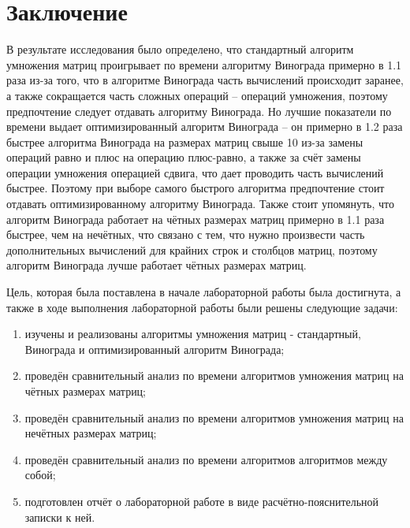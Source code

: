 \chapter*{Заключение}

В результате исследования было определено, что стандартный алгоритм умножения матриц проигрывает по времени алгоритму Винограда примерно в 1.1 раза из-за того, что в алгоритме Винограда часть вычислений происходит заранее, а также сокращается часть сложных операций -- операций умножения, поэтому предпочтение следует отдавать алгоритму Винограда. 
Но лучшие показатели по времени выдает оптимизированный алгоритм Винограда -- он примерно в 1.2 раза быстрее алгоритма Винограда на размерах матриц свыше 10 из-за замены операций равно и плюс на операцию плюс-равно, а также за счёт замены операции умножения операцией сдвига, что дает проводить часть вычислений быстрее. 
Поэтому при выборе самого быстрого алгоритма предпочтение стоит отдавать оптимизированному алгоритму Винограда. 
Также стоит упомянуть, что алгоритм Винограда работает на чётных размерах матриц примерно в 1.1 раза быстрее, чем на нечётных, что связано с тем, что нужно произвести часть дополнительных вычислений для крайних строк и столбцов матриц, поэтому алгоритм Винограда лучше работает чётных размерах матриц.


Цель, которая была поставлена в начале лабораторной работы была достигнута, а также в ходе выполнения лабораторной работы были решены следующие задачи:

\begin{enumerate}[label=\arabic*)]
	\item изучены и реализованы алгоритмы умножения матриц - стандартный, Винограда и оптимизированный алгоритм Винограда;
    \item проведён сравнительный анализ по времени алгоритмов умножения матриц на чётных размерах матриц;
	\item проведён сравнительный анализ по времени алгоритмов умножения матриц на нечётных размерах матриц;
	\item проведён сравнительный анализ по времени алгоритмов алгоритмов между собой;
	\item подготовлен отчёт о лабораторной работе в виде расчётно-пояснительной записки к ней.
\end{enumerate}